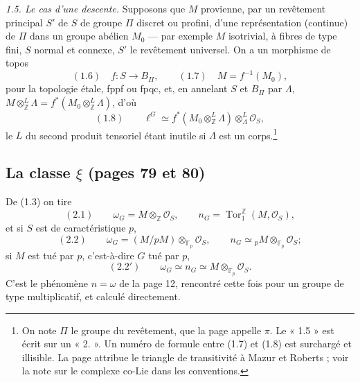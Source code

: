 \documentclass[11pt,a4paper]{article}
\begin{document}
\emph{1.5. Le cas d'une descente.} Supposons que $M$ provienne, par un
revêtement principal $S'$ de $S$ de groupe $\Pi$ discret ou profini, d'une
représentation (continue) de $\Pi$ dans un groupe abélien $M_{0}$ — par
exemple $M$ isotrivial, à fibres de type fini, $S$ normal et connexe, $S'$
le revêtement universel. On a un morphisme de topos
\[
(1.6) \quad f\colon S \longrightarrow B_{\Pi}, \qquad (1.7) \quad M =
f^{-1}(M_{0}),
\]
pour la topologie étale, fppf ou fpqc, et, en annelant $S$ et $B_{\Pi}$ par
$\Lambda$, $M \otimes^{L}_{\mathbb{Z}} \Lambda = f^{*}(M_{0}
\otimes^{L}_{\mathbb{Z}} \Lambda)$, d'où
\[
(1.8) \qquad \ell^{G} \simeq f^{*}(M_{0} \otimes^{L}_{\mathbb{Z}} \Lambda)
\otimes^{L}_{\Lambda} \mathcal{O}_{S} ,
\]
le $L$ du second produit tensoriel étant inutile si $\Lambda$ est un
corps.\footnote{On note $\Pi$ le groupe du revêtement, que la page appelle $\pi$.
Le « 1.5 » est écrit sur un « 2. ». Un numéro de formule entre (1.7) et
(1.8) est surchargé et illisible. La page attribue le triangle de
transitivité à Mazur et Roberts ; voir la note sur le complexe co-Lie dans
les conventions.}

\subsection*{La classe $\xi$ (pages 79 et 80)}

De (1.3) on tire
\[
(2.1) \qquad \omega_{G} = M \otimes_{\mathbb{Z}} \mathcal{O}_{S}, \qquad
n_{G} = \operatorname{Tor}_{1}^{\mathbb{Z}}(M, \mathcal{O}_{S}),
\]
et si $S$ est de caractéristique $p$,
\[
(2.2) \qquad \omega_{G} = (M/pM) \otimes_{\mathbb{F}_{p}} \mathcal{O}_{S},
\qquad n_{G} \simeq {}_{p}M \otimes_{\mathbb{F}_{p}} \mathcal{O}_{S} ;
\]
si $M$ est tué par $p$, c'est-à-dire $G$ tué par $p$,
\[
(2.2') \qquad \omega_{G} \simeq n_{G} \simeq M \otimes_{\mathbb{F}_{p}}
\mathcal{O}_{S} .
\]
C'est le phénomène $n = \omega$ de la page 12, rencontré cette fois pour un
groupe de type multiplicatif, et calculé directement.
\end{document}

